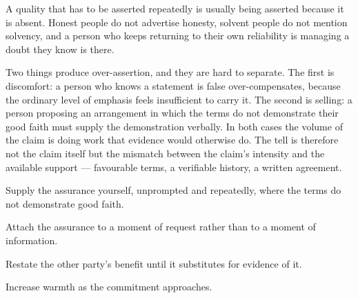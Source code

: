 


\begin{core}
A quality that has to be asserted repeatedly is usually being asserted because it is absent. Honest people do not advertise honesty, solvent people do not mention solvency, and a person who keeps returning to their own reliability is managing a doubt they know is there.
\end{core}

\begin{mechanism}
Two things produce over-assertion, and they are hard to separate. The first is discomfort: a person who knows a statement is false over-compensates, because the ordinary level of emphasis feels insufficient to carry it. The second is selling: a person proposing an arrangement in which the terms do not demonstrate their good faith must supply the demonstration verbally. In both cases the volume of the claim is doing work that evidence would otherwise do. The tell is therefore not the claim itself but the mismatch between the claim's intensity and the available support --- favourable terms, a verifiable history, a written agreement.
\end{mechanism}

\begin{application}
  \item Supply the assurance yourself, unprompted and repeatedly, where the terms do not demonstrate good faith.
  \item Attach the assurance to a moment of request rather than to a moment of information.
  \item Restate the other party's benefit until it substitutes for evidence of it.
  \item Increase warmth as the commitment approaches.
\end{application}

